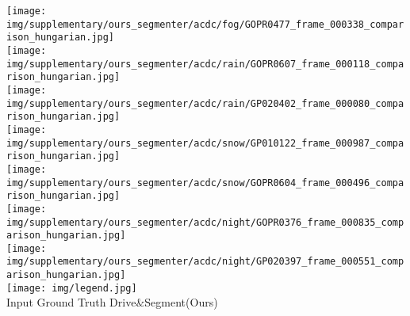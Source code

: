 \documentclass[runningheads]{llncs}
\newcommand{\ours}{Drive$\&$Segment\xspace}
\begin{document}
\begin{figure*}[t!]
    \texttt{[image: img/supplementary/ours\_segmenter/acdc/fog/GOPR0477\_frame\_000338\_comparison\_hungarian.jpg]} \\
    \texttt{[image: img/supplementary/ours\_segmenter/acdc/rain/GOPR0607\_frame\_000118\_comparison\_hungarian.jpg]} \\
    \texttt{[image: img/supplementary/ours\_segmenter/acdc/rain/GP020402\_frame\_000080\_comparison\_hungarian.jpg]} \\
    \texttt{[image: img/supplementary/ours\_segmenter/acdc/snow/GP010122\_frame\_000987\_comparison\_hungarian.jpg]} \\
    \texttt{[image: img/supplementary/ours\_segmenter/acdc/snow/GOPR0604\_frame\_000496\_comparison\_hungarian.jpg]} \\
    \texttt{[image: img/supplementary/ours\_segmenter/acdc/night/GOPR0376\_frame\_000835\_comparison\_hungarian.jpg]} \\
    \texttt{[image: img/supplementary/ours\_segmenter/acdc/night/GP020397\_frame\_000551\_comparison\_hungarian.jpg]} \\
    \texttt{[image: img/legend.jpg]} \\
    {\small \hspace*{1.7cm} Input \hspace{2.2cm} Ground Truth \hspace{1.5cm} \ours (Ours)}
\vspace*{-8pt}
\caption{\textbf{Waymo Open Dataset \emph{day} $\rightarrow$ ACDC~\cite{SDV21} \{\emph{fog, rain, snow, night}\}.} Qualitative results of our \ours model trained on the daytime images from the Waymo Open Dataset and used to segment samples from the ACDC~\cite{SDV21} dataset with various adverse conditions. 
In rows 2-5 the \emph{ground} is incorrectly segmented as \emph{sky}. This failure mode is further discussed in Section~\ref{sec:failure_cases}. }
\label{fig:qualitative_acdc}
\vspace{-1ex}
\end{figure*}

 
\end{document}
